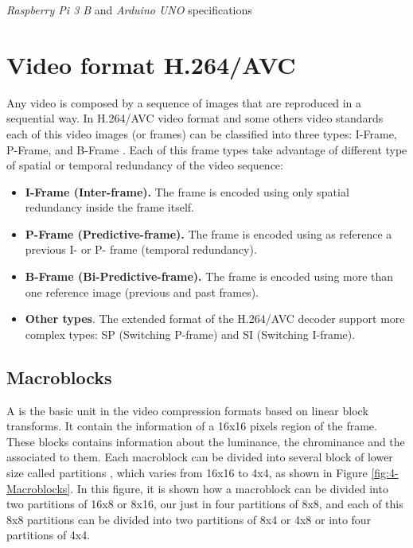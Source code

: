 \begin{table}[!h]
	\centering
	{\small
		
	}
	\caption{\textit{Raspberry Pi 3 B} and \textit{Arduino UNO} specifications}
	\label{tab:raspberry-vs-arduino}
\end{table}


\section{Video format H.264/AVC}
\label{subsect:H.264}
Any video is composed by a sequence of images that are reproduced in a sequential way. In H.264/AVC video format and some others video standards each of this video images (or frames) can be classified into three types: I-Frame, P-Frame, and B-Frame \cite{SC11}. Each of this frame types take advantage of different type of spatial or temporal redundancy of the video sequence: 
\begin{itemize}
	\item \textbf{I-Frame (Inter-frame).} The frame is encoded using only spatial redundancy inside the frame itself.
	\item \textbf{P-Frame (Predictive-frame).} The frame is encoded using as reference a previous I- or P- frame (temporal redundancy).
	\item \textbf{B-Frame (Bi-Predictive-frame).} The frame is encoded using more than one reference image (previous and past frames).
	\item \textbf{Other types}. The extended format of the H.264/AVC decoder support more complex types: SP (Switching P-frame) and SI (Switching I-frame).
\end{itemize}

\subsection{Macroblocks}
\label{subsect:Macroblocks}
A  is the basic unit in the video compression formats based on linear block transforms. It contain the information of a 16x16 pixels region of the frame. These blocks contains information about the luminance, the chrominance and the  associated to them. Each macroblock can be divided into several block of lower size called partitions \cite{Gir14}, which varies from 16x16 to 4x4, as shown in Figure \ref{fig:4-Macroblocks}. In this figure, it is shown how a macroblock can be divided into two partitions of 16x8 or 8x16, our just in four partitions of 8x8, and each of this 8x8 partitions can be divided into two partitions of 8x4 or 4x8 or into four partitions of 4x4.

